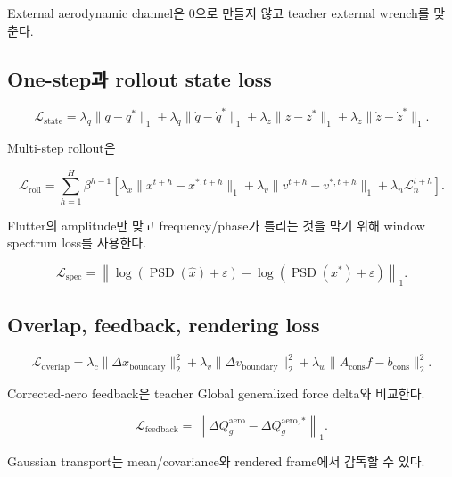 \documentclass[11pt,a4paper]{article}
\newcommand{\eps}{\varepsilon}
\begin{document}
External aerodynamic channel은 0으로 만들지 않고 teacher external wrench를 맞춘다.

\subsection{One-step과 rollout state loss}

\begin{equation}
  \mathcal L_{\mathrm{state}}
  =
  \lambda_q\|q-q^*\|_1
  +\lambda_{\dot q}\|\dot q-\dot q^*\|_1
  +\lambda_z\|z-z^*\|_1
  +\lambda_{\dot z}\|\dot z-\dot z^*\|_1.
\end{equation}

Multi-step rollout은

\begin{equation}
  \mathcal L_{\mathrm{roll}}
  =
  \sum_{h=1}^{H}
  \beta^{h-1}
  \left[
  \lambda_x\|x^{t+h}-x^{*,t+h}\|_1
  +\lambda_v\|v^{t+h}-v^{*,t+h}\|_1
  +\lambda_n\mathcal L_n^{t+h}
  \right].
\end{equation}

Flutter의 amplitude만 맞고 frequency/phase가 틀리는 것을 막기 위해
window spectrum loss를 사용한다.

\begin{equation}
  \mathcal L_{\mathrm{spec}}
  =
  \left\|
  \log(\operatorname{PSD}(\widehat x)+\eps)
  -
  \log(\operatorname{PSD}(x^*)+\eps)
  \right\|_1.
\end{equation}

\subsection{Overlap, feedback, rendering loss}

\begin{equation}
  \mathcal L_{\mathrm{overlap}}
  =
  \lambda_c\|\Delta x_{\mathrm{boundary}}\|_2^2
  +\lambda_v\|\Delta v_{\mathrm{boundary}}\|_2^2
  +\lambda_w\|A_{\mathrm{cons}}f-b_{\mathrm{cons}}\|_2^2.
\end{equation}

Corrected-aero feedback은 teacher Global generalized force delta와 비교한다.

\begin{equation}
  \mathcal L_{\mathrm{feedback}}
  =
  \left\|
  \Delta Q_g^{\mathrm{aero}}
  -
  \Delta Q_g^{\mathrm{aero},*}
  \right\|_1.
\end{equation}

Gaussian transport는 mean/covariance와 rendered frame에서 감독할 수 있다.
\end{document}
